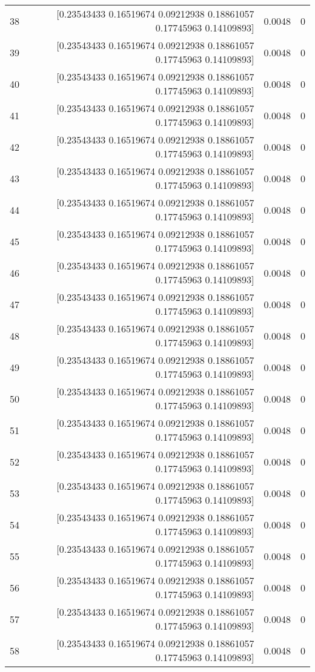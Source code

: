 \begin{longtable}{lrrr}
38 & [0.23543433 0.16519674 0.09212938 0.18861057 0.17745963 0.14109893] & 0.0048 & 0 \\
39 & [0.23543433 0.16519674 0.09212938 0.18861057 0.17745963 0.14109893] & 0.0048 & 0 \\
40 & [0.23543433 0.16519674 0.09212938 0.18861057 0.17745963 0.14109893] & 0.0048 & 0 \\
41 & [0.23543433 0.16519674 0.09212938 0.18861057 0.17745963 0.14109893] & 0.0048 & 0 \\
42 & [0.23543433 0.16519674 0.09212938 0.18861057 0.17745963 0.14109893] & 0.0048 & 0 \\
43 & [0.23543433 0.16519674 0.09212938 0.18861057 0.17745963 0.14109893] & 0.0048 & 0 \\
44 & [0.23543433 0.16519674 0.09212938 0.18861057 0.17745963 0.14109893] & 0.0048 & 0 \\
45 & [0.23543433 0.16519674 0.09212938 0.18861057 0.17745963 0.14109893] & 0.0048 & 0 \\
46 & [0.23543433 0.16519674 0.09212938 0.18861057 0.17745963 0.14109893] & 0.0048 & 0 \\
47 & [0.23543433 0.16519674 0.09212938 0.18861057 0.17745963 0.14109893] & 0.0048 & 0 \\
48 & [0.23543433 0.16519674 0.09212938 0.18861057 0.17745963 0.14109893] & 0.0048 & 0 \\
49 & [0.23543433 0.16519674 0.09212938 0.18861057 0.17745963 0.14109893] & 0.0048 & 0 \\
50 & [0.23543433 0.16519674 0.09212938 0.18861057 0.17745963 0.14109893] & 0.0048 & 0 \\
51 & [0.23543433 0.16519674 0.09212938 0.18861057 0.17745963 0.14109893] & 0.0048 & 0 \\
52 & [0.23543433 0.16519674 0.09212938 0.18861057 0.17745963 0.14109893] & 0.0048 & 0 \\
53 & [0.23543433 0.16519674 0.09212938 0.18861057 0.17745963 0.14109893] & 0.0048 & 0 \\
54 & [0.23543433 0.16519674 0.09212938 0.18861057 0.17745963 0.14109893] & 0.0048 & 0 \\
55 & [0.23543433 0.16519674 0.09212938 0.18861057 0.17745963 0.14109893] & 0.0048 & 0 \\
56 & [0.23543433 0.16519674 0.09212938 0.18861057 0.17745963 0.14109893] & 0.0048 & 0 \\
57 & [0.23543433 0.16519674 0.09212938 0.18861057 0.17745963 0.14109893] & 0.0048 & 0 \\
58 & [0.23543433 0.16519674 0.09212938 0.18861057 0.17745963 0.14109893] & 0.0048 & 0 \\

\end{longtable}
